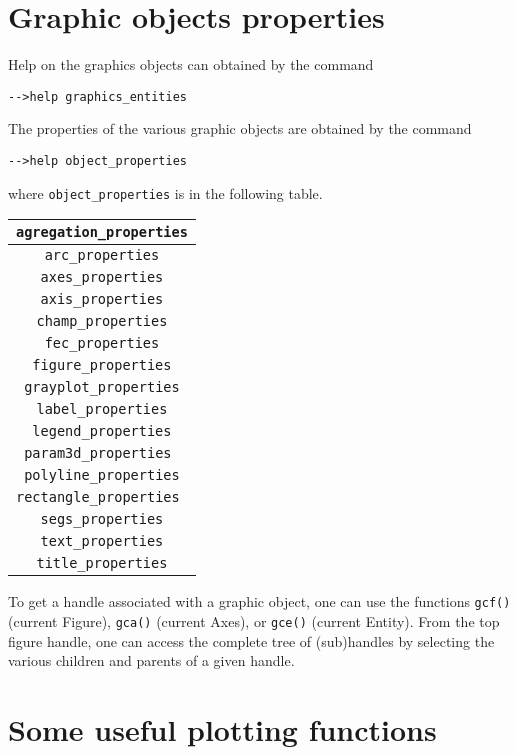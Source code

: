 \section{Graphic objects properties}
Help on the graphics objects can obtained by the command
\begin{verbatim}
-->help graphics_entities
\end{verbatim}
The properties of the various graphic objects are obtained by the command 
\begin{verbatim}
-->help object_properties
\end{verbatim}
where {\verb!object_properties!} is in the following table.
\begin{center}
\begin{tabular}{|c|}
\hline
{\verb!agregation_properties!} \\ \hline
{\verb!arc_properties!} \\ \hline
{\verb!axes_properties!} \\ \hline
{\verb!axis_properties! }  \\ \hline
{\verb!champ_properties! } \\ \hline
{\verb!fec_properties!} \\
{\verb!figure_properties!} \\ \hline
{\verb!grayplot_properties!} \\ \hline
{\verb!label_properties! } \\ \hline
{\verb!legend_properties! } \\ \hline
{\verb!param3d_properties !} \\ \hline
{\verb!polyline_properties! } \\ \hline
{\verb!rectangle_properties !} \\ \hline
{\verb!segs_properties! } \\ \hline
{\verb!text_properties! } \\ \hline
{\verb!title_properties! } \\ \hline
\end{tabular}
\end{center}

To get a handle associated with a graphic object, one can use the 
functions {\tt gcf()} (current Figure), {\tt gca()} (current Axes),
or {\tt gce()} (current Entity). From the top figure handle, one 
can access the complete tree of (sub)handles by selecting the various
children and parents of a given handle.

\section{Some useful plotting functions}
